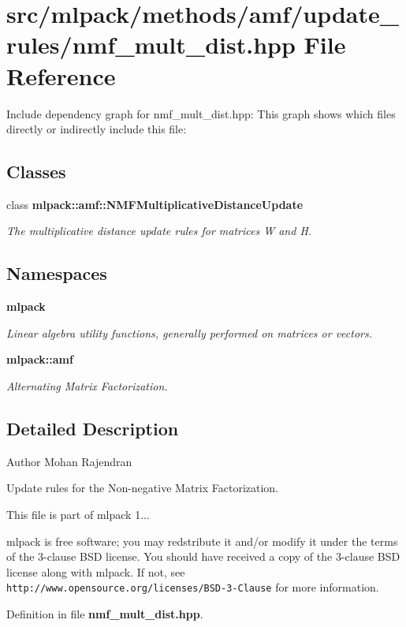 \section{src/mlpack/methods/amf/update\-\_\-rules/nmf\-\_\-mult\-\_\-dist.hpp File Reference}
\label{nmf__mult__dist_8hpp}
Include dependency graph for nmf\-\_\-mult\-\_\-dist.\-hpp\-:
This graph shows which files directly or indirectly include this file\-:
\subsection*{Classes}
\begin{DoxyCompactItemize}
\item 
class {\bf mlpack\-::amf\-::\-N\-M\-F\-Multiplicative\-Distance\-Update}
\begin{DoxyCompactList}\small\item\em The multiplicative distance update rules for matrices W and H. \end{DoxyCompactList}\end{DoxyCompactItemize}
\subsection*{Namespaces}
\begin{DoxyCompactItemize}
\item 
{\bf mlpack}
\begin{DoxyCompactList}\small\item\em Linear algebra utility functions, generally performed on matrices or vectors. \end{DoxyCompactList}\item 
{\bf mlpack\-::amf}
\begin{DoxyCompactList}\small\item\em Alternating Matrix Factorization. \end{DoxyCompactList}\end{DoxyCompactItemize}


\subsection{Detailed Description}
\begin{DoxyAuthor}{Author}
Mohan Rajendran
\end{DoxyAuthor}
Update rules for the Non-\/negative Matrix Factorization.

This file is part of mlpack 1...

mlpack is free software; you may redstribute it and/or modify it under the terms of the 3-\/clause B\-S\-D license. You should have received a copy of the 3-\/clause B\-S\-D license along with mlpack. If not, see {\tt http\-://www.\-opensource.\-org/licenses/\-B\-S\-D-\/3-\/\-Clause} for more information. 

Definition in file {\bf nmf\-\_\-mult\-\_\-dist.\-hpp}.

